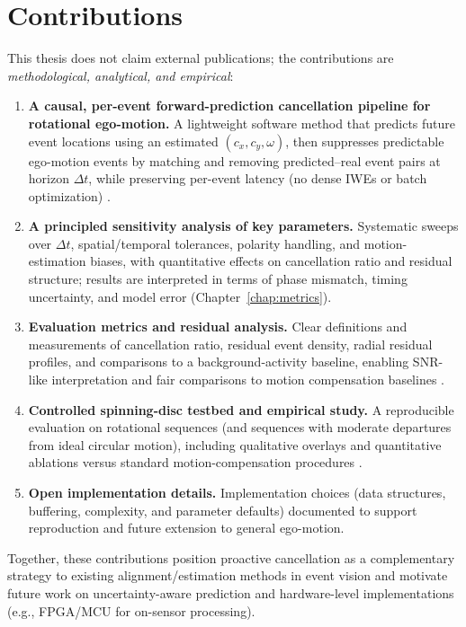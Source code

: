 \section{Contributions}
\label{sec:contributions}

This thesis does not claim external publications; the contributions are \emph{methodological, analytical, and empirical}:

\begin{enumerate}
    \item \textbf{A causal, per-event forward-prediction cancellation pipeline for rotational ego-motion.} A lightweight software method that predicts future event locations using an estimated $(c_x,c_y,\omega)$, then suppresses predictable ego-motion events by matching and removing predicted–real event pairs at horizon $\Delta t$, while preserving per-event latency (no dense IWEs or batch optimization) \cite{Bardow2016SOFIE,Gallego2018CMax}.
    \item \textbf{A principled sensitivity analysis of key parameters.} Systematic sweeps over $\Delta t$, spatial/temporal tolerances, polarity handling, and motion-estimation biases, with quantitative effects on cancellation ratio and residual structure; results are interpreted in terms of phase mismatch, timing uncertainty, and model error (Chapter~\ref{chap:metrics}).
    \item \textbf{Evaluation metrics and residual analysis.} Clear definitions and measurements of cancellation ratio, residual event density, radial residual profiles, and comparisons to a background-activity baseline, enabling SNR-like interpretation and fair comparisons to motion compensation baselines \cite{Gallego2020Survey,Bardow2016SOFIE,Gallego2018CMax,Xu2020}.
    \item \textbf{Controlled spinning-disc testbed and empirical study.} A reproducible evaluation on rotational sequences (and sequences with moderate departures from ideal circular motion), including qualitative overlays and quantitative ablations versus standard motion-compensation procedures \cite{Gallego2018CMax,Bardow2016SOFIE,Stoffregen2019Segmentation}.
    \item \textbf{Open implementation details.} Implementation choices (data structures, buffering, complexity, and parameter defaults) documented to support reproduction and future extension to general ego-motion.
\end{enumerate}
Together, these contributions position proactive cancellation as a complementary strategy to existing alignment/estimation methods in event vision \cite{Bardow2016SOFIE,Rebecq2017EVO,Gallego2018CMax} and motivate future work on uncertainty-aware prediction and hardware-level implementations (e.g., FPGA/MCU for on-sensor processing).

